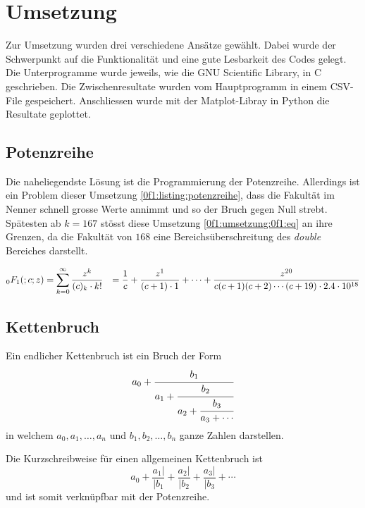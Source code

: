 %
%
%
\section{Umsetzung
\label{0f1:section:teil2}}
Zur Umsetzung wurden drei verschiedene Ansätze gewählt. Dabei wurde der Schwerpunkt auf die Funktionalität und eine gute Lesbarkeit des Codes gelegt.
Die Unterprogramme wurde jeweils, wie die GNU Scientific Library, in C geschrieben. Die Zwischenresultate wurden vom Hauptprogramm in einem CSV-File gespeichert. Anschliessen wurde mit der Matplot-Libray in Python die Resultate geplottet.

\subsection{Potenzreihe
\label{0f1:subsection:potenzreihe}}
Die naheliegendste Lösung ist die Programmierung der Potenzreihe. Allerdings ist ein Problem dieser Umsetzung \ref{0f1:listing:potenzreihe}, dass die Fakultät im Nenner schnell grosse Werte annimmt und so der Bruch gegen Null strebt. Spätesten ab $k=167$ stösst diese Umsetzung  \eqref{0f1:umsetzung:0f1:eq} an ihre Grenzen, da die Fakultät von $168$ eine Bereichsüberschreitung des \textit{double} Bereiches darstellt. \cite{0f1:double}

\begin{align}
    \label{0f1:umsetzung:0f1:eq}
    \mathstrut_0F_1(;c;z)
    &=
    \sum_{k=0}^\infty
    \frac{z^k}{(c)_k \cdot k!}
    &= 
    \frac{1}{c}
    +\frac{z^1}{(c+1) \cdot 1}
    + \cdots
    + \frac{z^{20}}{c(c+1)(c+2)\cdots(c+19) \cdot 2.4 \cdot 10^{18}}
\end{align}



\subsection{Kettenbruch
\label{0f1:subsection:kettenbruch}}
Ein endlicher Kettenbruch ist ein Bruch der Form
\begin{equation*}
a_0 + \cfrac{b_1}{a_1+\cfrac{b_2}{a_2+\cfrac{b_3}{a_3+\cdots}}}
\end{equation*}
in welchem $a_0, a_1,\dots,a_n$ und $b_1,b_2,\dots,b_n$ ganze Zahlen darstellen.

Die Kurzschreibweise für einen allgemeinen Kettenbruch ist 
\begin{equation*}
	a_0 + \frac{a_1|}{|b_1} + \frac{a_2|}{|b_2} + \frac{a_3|}{|b_3} + \cdots
\end{equation*}
und ist somit verknüpfbar mit der Potenzreihe.
\cite{0f1:wiki-kettenbruch}

